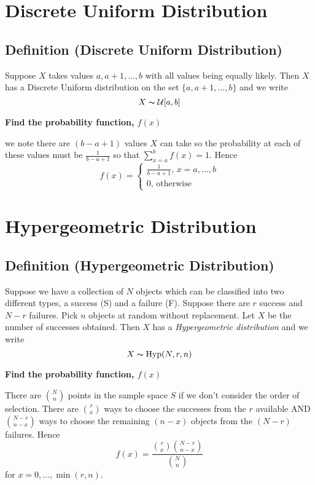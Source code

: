 \section{Discrete Uniform Distribution}
\begin{defbox}
    \subsection{Definition (Discrete Uniform Distribution)}
    Suppose $ X $ takes values $ a,a+1,\ldots ,b $ with all values
    being equally likely. Then $ X $ has a Discrete Uniform distribution
    on the set $ \{a,a+1,\ldots ,b\} $ and we write
    \[ X \thicksim \operatorname{\mathcal{U}}[a,b] \]
\end{defbox}

\textbf{Find the probability function, $ f(x)$}

we note there are $ (b-a+1) $ values $ X $ can take so the probability
at each of these values must be $ \frac{1}{b-a+1} $ so that
$ \sum\limits_{x=a}^{b} f(x)=1 $. Hence
\[ f(x)=
    \begin{cases}
        \frac{1}{b-a+1},\,x=a,\ldots,b \\
        0,\,\text{otherwise}
    \end{cases} \]

\section{Hypergeometric Distribution}
\begin{defbox}
    \subsection{Definition (Hypergeometric Distribution)}
    Suppose we have a collection of $ N $ objects which can be
    classified into two different types, a success (S) and a failure (F).
    Suppose there are $ r $ success and $ N-r $ failures. Pick $ n $
    objects at random without replacement. Let $ X $ be the number of successes
    obtained. Then $ X $ has a \emph{Hypergeometric distribution} and we write
    \[ X \thicksim \operatorname{Hyp}(N,r,n) \]
\end{defbox}

\textbf{Find the probability function, $ f(x)$}

There are $ \binom{N}{n} $ points in the sample space $ S $ if we don't
consider the order of selection. There are $ \binom{r}{x} $ ways to choose
the successes from the $ r $ available AND $ \binom{N-r}{n-x} $ ways to choose
the remaining $ (n-x) $ objects from the $ (N-r) $ failures. Hence
\[ f(x)=\frac{\binom{r}{x}\binom{N-r}{n-x}}{\binom{N}{n}} \]
for $ x=0,\ldots ,\min(r,n) $.

